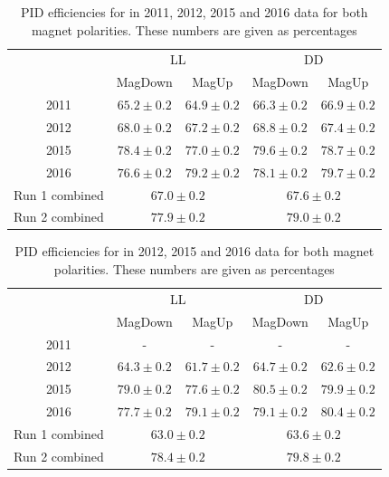\begin{table}[h]
\centering
\begin{tabular}{c|cc|cc}
\hline
& \multicolumn{2}{c}{LL} & \multicolumn{2}{c}{DD} \\
& MagDown & MagUp & MagDown & MagUp \\
\hline
2011 & $65.2 \pm 0.2$ & $64.9 \pm 0.2$ & $66.3 \pm 0.2$ & $66.9 \pm 0.2$ \\
2012 & $68.0 \pm 0.2$ & $67.2 \pm 0.2$ & $68.8 \pm 0.2$ & $67.4 \pm 0.2$ \\
2015 & $78.4 \pm 0.2$ & $77.0 \pm 0.2$ & $79.6 \pm 0.2$ & $78.7 \pm 0.2$ \\
2016 & $76.6 \pm 0.2$ & $79.2 \pm 0.2$ & $78.1 \pm 0.2$ & $79.7 \pm 0.2$ \\
\hline
Run 1 combined & \multicolumn{2}{c}{$67.0 \pm 0.2$} & \multicolumn{2}{c}{$67.6 \pm 0.2$} \\
Run 2 combined & \multicolumn{2}{c}{$77.9 \pm 0.2$} & \multicolumn{2}{c}{$79.0 \pm 0.2$} \\
\hline
\end{tabular}
\caption{PID efficiencies for \decay{\Dz}{\pip\pim} in 2011, 2012, 2015 and 2016 data for both magnet polarities. These numbers are given as percentages}
\label{pideffpipi}
\end{table}

\begin{table}[h]
\centering
\begin{tabular}{c|cc|cc}
\hline
& \multicolumn{2}{c}{LL} & \multicolumn{2}{c}{DD} \\
& MagDown & MagUp & MagDown & MagUp \\
\hline
2011 & - & - & - & - \\
2012 & $64.3 \pm 0.2$ & $61.7 \pm 0.2$ & $64.7 \pm 0.2$ & $62.6 \pm 0.2$ \\
2015 & $79.0 \pm 0.2$ & $77.6 \pm 0.2$ & $80.5 \pm 0.2$ & $79.9 \pm 0.2$ \\
2016 & $77.7 \pm 0.2$ & $79.1 \pm 0.2$ & $79.1 \pm 0.2$ & $80.4 \pm 0.2$ \\
\hline
Run 1 combined & \multicolumn{2}{c}{$63.0 \pm 0.2$} & \multicolumn{2}{c}{$63.6 \pm 0.2$} \\
Run 2 combined & \multicolumn{2}{c}{$78.4 \pm 0.2$} & \multicolumn{2}{c}{$79.8 \pm 0.2$} \\
\hline
\end{tabular}
\caption{PID efficiencies for \decay{\Dz}{\Km\pip\pim\pip} in 2012, 2015 and 2016 data for both magnet polarities. These numbers are given as percentages}
\label{pideffkpipipi}
\end{table}

